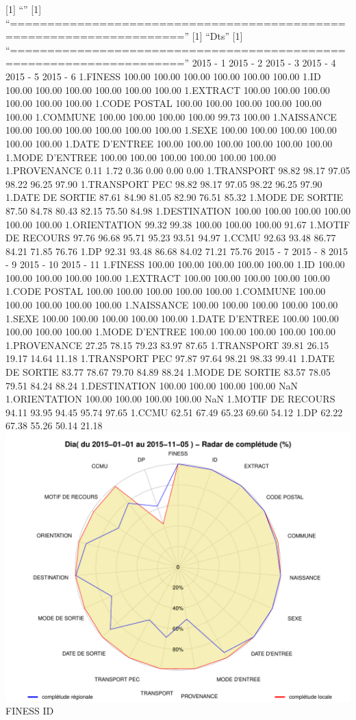 \documentclass[]{article}
\begin{document}
{[}1{]} ``'' {[}1{]}
``=====================================================================''
{[}1{]} ``Dts'' {[}1{]}
``=====================================================================''
2015 - 1 2015 - 2 2015 - 3 2015 - 4 2015 - 5 2015 - 6 1.FINESS 100.00
100.00 100.00 100.00 100.00 100.00 1.ID 100.00 100.00 100.00 100.00
100.00 100.00 1.EXTRACT 100.00 100.00 100.00 100.00 100.00 100.00 1.CODE
POSTAL 100.00 100.00 100.00 100.00 100.00 100.00 1.COMMUNE 100.00 100.00
100.00 100.00 99.73 100.00 1.NAISSANCE 100.00 100.00 100.00 100.00
100.00 100.00 1.SEXE 100.00 100.00 100.00 100.00 100.00 100.00 1.DATE
D'ENTREE 100.00 100.00 100.00 100.00 100.00 100.00 1.MODE D'ENTREE
100.00 100.00 100.00 100.00 100.00 100.00 1.PROVENANCE 0.11 1.72 0.36
0.00 0.00 0.00 1.TRANSPORT 98.82 98.17 97.05 98.22 96.25 97.90
1.TRANSPORT PEC 98.82 98.17 97.05 98.22 96.25 97.90 1.DATE DE SORTIE
87.61 84.90 81.05 82.90 76.51 85.32 1.MODE DE SORTIE 87.50 84.78 80.43
82.15 75.50 84.98 1.DESTINATION 100.00 100.00 100.00 100.00 100.00
100.00 1.ORIENTATION 99.32 99.38 100.00 100.00 100.00 91.67 1.MOTIF DE
RECOURS 97.76 96.68 95.71 95.23 93.51 94.97 1.CCMU 92.63 93.48 86.77
84.21 71.85 76.76 1.DP 92.31 93.48 86.68 84.02 71.21 75.76 2015 - 7 2015
- 8 2015 - 9 2015 - 10 2015 - 11 1.FINESS 100.00 100.00 100.00 100.00
100.00 1.ID 100.00 100.00 100.00 100.00 100.00 1.EXTRACT 100.00 100.00
100.00 100.00 100.00 1.CODE POSTAL 100.00 100.00 100.00 100.00 100.00
1.COMMUNE 100.00 100.00 100.00 100.00 100.00 1.NAISSANCE 100.00 100.00
100.00 100.00 100.00 1.SEXE 100.00 100.00 100.00 100.00 100.00 1.DATE
D'ENTREE 100.00 100.00 100.00 100.00 100.00 1.MODE D'ENTREE 100.00
100.00 100.00 100.00 100.00 1.PROVENANCE 27.25 78.15 79.23 83.97 87.65
1.TRANSPORT 39.81 26.15 19.17 14.64 11.18 1.TRANSPORT PEC 97.87 97.64
98.21 98.33 99.41 1.DATE DE SORTIE 83.77 78.67 79.70 84.89 88.24 1.MODE
DE SORTIE 83.57 78.05 79.51 84.24 88.24 1.DESTINATION 100.00 100.00
100.00 100.00 NaN 1.ORIENTATION 100.00 100.00 100.00 100.00 NaN 1.MOTIF
DE RECOURS 94.11 93.95 94.45 95.74 97.65 1.CCMU 62.51 67.49 65.23 69.60
54.12 1.DP 62.22 67.38 55.26 50.14 21.18
\includegraphics{completude_files/figure-latex/finess-5.pdf} FINESS ID
\end{document}
